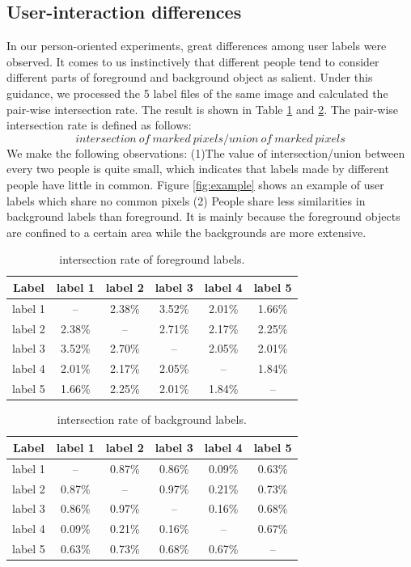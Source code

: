 \documentclass[runningheads,a4paper]{llncs}
\begin{document}
\subsection{User-interaction differences}
In our person-oriented experiments, great differences among user labels were observed. It comes to us instinctively that different people tend to consider different parts of foreground and background object as salient. Under this guidance, we processed the 5 label files of the same image and calculated the pair-wise intersection rate. The result is shown in Table \ref{ta:intersection rate f} and \ref{ta:intersection rate b}. The pair-wise intersection rate is defined as follows:
$$intersection\ of\ marked\ pixels/union\ of\ marked\ pixels$$
We make the following observations: (1)The value of intersection/union between every two people is quite small, which indicates that labels made by different people have little in common. Figure \ref{fig:example} shows an example of user labels which share no common pixels (2) People share less similarities in background labels than foreground. It is mainly because the foreground objects are confined to a certain area while the backgrounds are more extensive.

\begin{table}
\centering
\caption{intersection rate of foreground labels.}
\begin{tabular}{|c|c|c|c|c|c|}
\hline
 Label & label 1 & label 2 & label 3 & label 4& label 5 \\
\hline
label 1 & -- & 2.38\% & 3.52\% & 2.01\%& 1.66\% \\
\hline
label 2 & 2.38\% & -- & 2.71\% & 2.17\%& 2.25\% \\
\hline
label 3 & 3.52\% & 2.70\% & -- & 2.05\%& 2.01\%\\
\hline
label 4 & 2.01\% & 2.17\% & 2.05\% & -- & 1.84\% \\
\hline
label 5 & 1.66\% & 2.25\% & 2.01\% & 1.84\%& -- \\
\hline
\end{tabular}
\label{ta:intersection rate f}
\end{table}


\begin{table}
\centering
\caption{intersection rate of background labels.}
\begin{tabular}{|c|c|c|c|c|c|}
\hline
 Label & label 1 & label 2 & label 3 & label 4& label 5 \\
\hline
label 1 & -- & 0.87\% & 0.86\% & 0.09\%& 0.63\% \\
\hline
label 2 & 0.87\% & -- & 0.97\% & 0.21\%& 0.73\% \\
\hline
label 3 & 0.86\% & 0.97\% & -- & 0.16\%& 0.68\%\\
\hline
label 4 & 0.09\% & 0.21\% & 0.16\% & -- & 0.67\% \\
\hline
label 5 & 0.63\% & 0.73\% & 0.68\% & 0.67\% & -- \\
\hline
\end{tabular}
\label{ta:intersection rate b}
\end{table}
\end{document}
